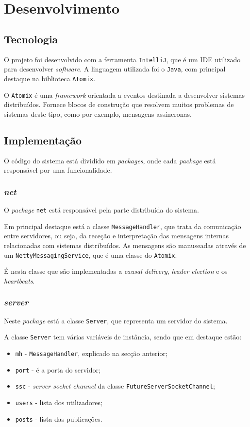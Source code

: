 \documentclass[12pt, a4paper]{report}
\begin{document}
\chapter{Desenvolvimento}
\section{Tecnologia}
O projeto foi desenvolvido com a ferramenta \texttt{IntelliJ}, que é um IDE utilizado para desenvolver \textit{software}.
A linguagem utilizada foi o \texttt{Java}, com principal destaque na biblioteca \texttt{Atomix}.

O \texttt{Atomix} é uma \textit{framework} orientada a eventos destinada a desenvolver sistemas distribuídos. Fornece blocos de construção que resolvem muitos problemas de sistemas deste tipo, como por exemplo, mensagens assíncronas.

\section{Implementação}
O código do sistema está dividido em \textit{packages}, onde cada \textit{package} está responsável por uma funcionalidade.


\subsection{\textit{net}}
O \textit{package} \texttt{net} está responsável pela parte distribuída do sistema.

Em principal destaque está a classe \texttt{MessageHandler}, que trata da comunicação entre servidores, ou seja, da receção e interpretação das mensagens internas relacionadas com sistemas distribuídos.
As mensagens são manuseadas através de um \texttt{NettyMessagingService}, que é uma classe do \texttt{Atomix}.

É nesta classe que são implementadas a \textit{causal delivery}, \textit{leader election} e os \textit{heartbeats}.


\subsection{\textit{server}}
Neste \textit{package} está a classe \texttt{Server}, que representa um servidor do sistema.

A classe \texttt{Server} tem várias variáveis de instância, sendo que em destaque estão:
\begin{itemize}
    \item \texttt{mh} - \texttt{MessageHandler}, explicado na secção anterior;
    \item \texttt{port} - é a porta do servidor;
    \item \texttt{ssc} - \textit{server socket channel} da classe \texttt{FutureServerSocketChannel};
    \item \texttt{users} - lista dos utilizadores;
    \item \texttt{posts} - lista das publicações.
\end{itemize}
\end{document}
